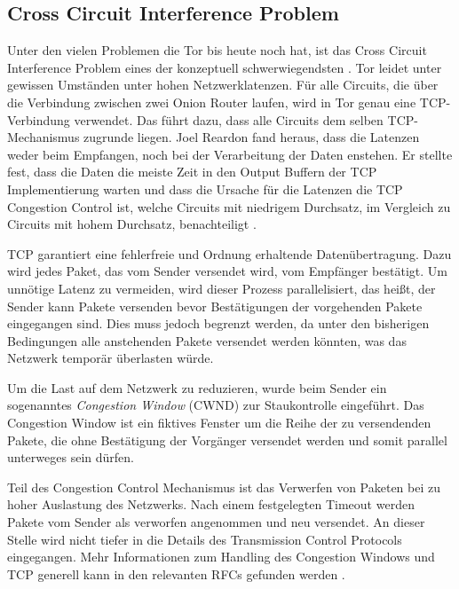 \documentclass[fleqn,envcountsame,runningheads,10pt,a4paper]{llncs}
\begin{document}
\subsection{Cross Circuit Interference Problem}
\label{sec:crosscircuitinterference} 

Unter den vielen Problemen die Tor bis heute noch hat, ist das Cross Circuit 
Interference Problem eines der konzeptuell schwerwiegendsten 
\cite{tor_improvements}. Tor leidet unter gewissen Umständen unter hohen 
Netzwerklatenzen. Für alle Circuits, die über die Verbindung zwischen zwei Onion 
Router laufen, wird in Tor genau eine TCP-Verbindung verwendet. Das führt dazu, 
dass alle Circuits dem selben TCP-Mechanismus zugrunde liegen. Joel Reardon fand 
heraus, dass die Latenzen weder beim Empfangen, noch bei der Verarbeitung der 
Daten enstehen. Er stellte fest, dass die Daten die meiste Zeit in den Output 
Buffern der TCP Implementierung warten und dass die Ursache für die Latenzen die 
TCP Congestion Control ist, welche Circuits mit niedrigem Durchsatz, im 
Vergleich zu Circuits mit hohem Durchsatz, benachteiligt 
\cite{tcp-over-dtls-thesis,tcp-over-dtls}.

TCP garantiert eine fehlerfreie und Ordnung erhaltende Datenübertragung. Dazu 
wird jedes Paket, das vom Sender versendet wird, vom Empfänger bestätigt. Um 
unnötige Latenz zu vermeiden, wird dieser Prozess parallelisiert, das heißt, der 
Sender kann Pakete versenden bevor Bestätigungen der vorgehenden Pakete 
eingegangen sind. Dies muss jedoch begrenzt werden, da unter den bisherigen 
Bedingungen alle anstehenden Pakete versendet werden könnten, was das Netzwerk 
temporär überlasten würde.

Um die Last auf dem Netzwerk zu reduzieren, wurde beim Sender ein sogenanntes 
\textit{Congestion Window} (CWND) zur Staukontrolle eingeführt. Das Congestion 
Window ist ein fiktives Fenster um die Reihe der zu versendenden Pakete, die 
ohne Bestätigung der Vorgänger versendet werden und somit parallel unterweges 
sein dürfen.

Teil des Congestion Control Mechanismus ist das Verwerfen von Paketen bei zu 
hoher Auslastung des Netzwerks. Nach einem festgelegten Timeout werden Pakete 
vom Sender als verworfen angenommen und neu versendet. An dieser Stelle wird 
nicht tiefer in die Details des Transmission Control Protocols eingegangen. Mehr 
Informationen zum Handling des Congestion Windows und TCP generell kann in den 
relevanten RFCs gefunden werden \cite{rfc:tcp, rfc:tcpcc}.
\end{document}
